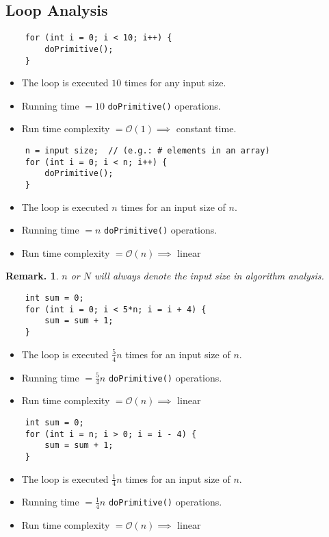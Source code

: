 \documentclass[12pt, a4paper]{article}
\newtheorem*{rmk}{Remark.}
\def\O{\mathcal{O}}
\begin{document}
\subsection*{Loop Analysis}
\begin{lstlisting}
	for (int i = 0; i < 10; i++) {
		doPrimitive();
	}
\end{lstlisting}
\begin{itemize}
	\item The loop is executed $10$ times for any input size.
	\item Running time $=10$ \texttt{doPrimitive()} operations.
	\item Run time complexity $=\O(1)\implies$ constant time.
\end{itemize}
\begin{lstlisting}
	n = input size;  // (e.g.: # elements in an array)
	for (int i = 0; i < n; i++) {
		doPrimitive();
	}
\end{lstlisting}
\begin{itemize}
	\item The loop is executed $n$ times for an input size of $n$.
	\item Running time $=n$ \texttt{doPrimitive()} operations.
	\item Run time complexity $=\O(n)\implies$ linear
\end{itemize}
\begin{rmk}	$n$ or $N$ will always denote the input size in algorithm analysis. \end{rmk}
\begin{lstlisting}
	int sum = 0;
	for (int i = 0; i < 5*n; i = i + 4) {
		sum = sum + 1;
	}
\end{lstlisting}
\begin{itemize}
	\item The loop is executed $\frac{5}{4}n$ times for an input size of $n$.
	\item Running time $=\frac{5}{4}n$ \texttt{doPrimitive()} operations.
	\item Run time complexity $=\O(n)\implies$ linear
\end{itemize}
\begin{lstlisting}
	int sum = 0;
	for (int i = n; i > 0; i = i - 4) {
		sum = sum + 1;
	}
\end{lstlisting}
\begin{itemize}
	\item The loop is executed $\frac{1}{4}n$ times for an input size of $n$.
	\item Running time $=\frac{1}{4}n$ \texttt{doPrimitive()} operations.
	\item Run time complexity $=\O(n)\implies$ linear
\end{itemize}
\end{document}
